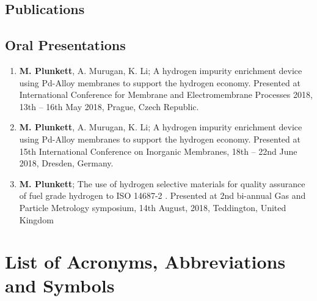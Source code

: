\documentclass[a4paper,12pt]{report}
\begin{document}
\section*{Publications}

\section*{Oral Presentations}
\begin{enumerate}
    \item \textbf{M. Plunkett}, A. Murugan, K. Li; A hydrogen impurity enrichment device using Pd-Alloy membranes to support the hydrogen economy. Presented at International Conference for Membrane and Electromembrane Processes 2018, 13th – 16th May 2018, Prague, Czech Republic.
    \item \textbf{M. Plunkett}, A. Murugan, K. Li; A hydrogen impurity enrichment device using Pd-Alloy membranes to support the hydrogen economy. Presented at 15th International Conference on Inorganic Membranes, 18th – 22nd June 2018, Dresden, Germany. 
    \item \textbf{M. Plunkett}; The use of hydrogen selective materials for quality assurance of fuel grade hydrogen to ISO 14687-2 . Presented at 2nd bi-annual Gas and Particle Metrology symposium, 14th August, 2018, Teddington, United Kingdom 
\end{enumerate}

\listoffigures
\listoftables

\chapter*{List of Acronyms, Abbreviations and Symbols}


\tableofcontents













\end{document}
